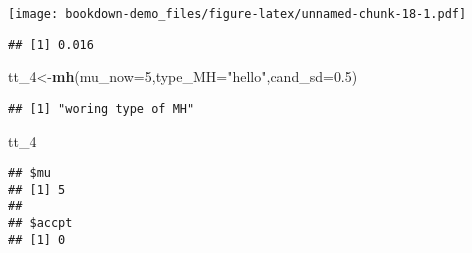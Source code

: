 \documentclass[]{book}
\newenvironment{Shaded}{\begin{snugshade}}{\end{snugshade}}
\newcommand{\KeywordTok}[1]{\textcolor[rgb]{0.13,0.29,0.53}{\textbf{#1}}}
\newcommand{\DataTypeTok}[1]{\textcolor[rgb]{0.13,0.29,0.53}{#1}}
\newcommand{\DecValTok}[1]{\textcolor[rgb]{0.00,0.00,0.81}{#1}}
\newcommand{\FloatTok}[1]{\textcolor[rgb]{0.00,0.00,0.81}{#1}}
\newcommand{\StringTok}[1]{\textcolor[rgb]{0.31,0.60,0.02}{#1}}
\newcommand{\OperatorTok}[1]{\textcolor[rgb]{0.81,0.36,0.00}{\textbf{#1}}}
\newcommand{\NormalTok}[1]{#1}
\begin{document}
\texttt{[image: bookdown-demo\_files/figure-latex/unnamed-chunk-18-1.pdf]}

\begin{Shaded}
\end{Shaded}

\begin{verbatim}
## [1] 0.016
\end{verbatim}

\begin{Shaded}
\begin{Highlighting}[]
\NormalTok{tt_}\DecValTok{4}\NormalTok{<-}\KeywordTok{mh}\NormalTok{(}\DataTypeTok{mu_now=}\DecValTok{5}\NormalTok{,}\DataTypeTok{type_MH=}\StringTok{"hello"}\NormalTok{,}\DataTypeTok{cand_sd=}\FloatTok{0.5}\NormalTok{)}
\end{Highlighting}
\end{Shaded}

\begin{verbatim}
## [1] "woring type of MH"
\end{verbatim}

\begin{Shaded}
\begin{Highlighting}[]
\NormalTok{tt_}\DecValTok{4}
\end{Highlighting}
\end{Shaded}

\begin{verbatim}
## $mu
## [1] 5
## 
## $accpt
## [1] 0
\end{verbatim}


\end{document}
